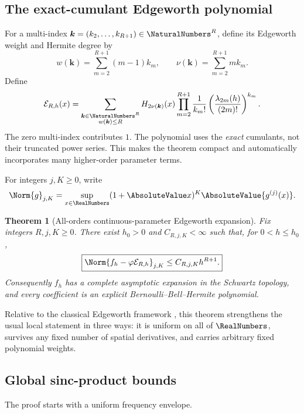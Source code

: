 \documentclass[11pt]{article}
\numberwithin{equation}{section}
\newtheorem{theorem}{Theorem}[section]
\theoremstyle{definition}
\newcommand{\phiN}{\varphi}
\begin{document}
\subsection{The exact-cumulant Edgeworth polynomial}
For a multi-index \(\bm k=(k_2,\ldots,k_{R+1})\in\NaturalNumbers^R\), define its Edgeworth weight and Hermite degree by
\begin{equation}\label{eq:weights}
 w(\bm k)=\sum_{m=2}^{R+1}(m-1)k_m,
 \qquad
 \nu(\bm k)=\sum_{m=2}^{R+1}mk_m.
\end{equation}
Define
\begin{equation}\label{eq:edgeworth-polynomial}
 \mathcal E_{R,h}(x)=
 \sum_{\substack{\bm k\in\NaturalNumbers^R\\w(\bm k)\le R}}
 H_{2\nu(\bm k)}(x)
 \prod_{m=2}^{R+1}\frac1{k_m!}
 \left(\frac{\lambda_{2m}(h)}{(2m)!}\right)^{k_m}.
\end{equation}
The zero multi-index contributes \(1\).  The polynomial uses the \emph{exact} cumulants, not their truncated power series.  This makes the theorem compact and automatically incorporates many higher-order parameter terms.

For integers \(j,K\ge0\), write
\begin{equation}\label{eq:schwartz-seminorm}
 \Norm{g}_{j,K}=\sup_{x\in\RealNumbers}(1+\AbsoluteValue x)^K\AbsoluteValue{g^{(j)}(x)}.
\end{equation}

\begin{theorem}[All-orders continuous-parameter Edgeworth expansion]\label{thm:edgeworth-schwartz}
Fix integers \(R,j,K\ge0\).  There exist \(h_0>0\) and \(C_{R,j,K}<\infty\) such that, for \(0<h\le h_0\),
\begin{equation}\label{eq:edgeworth-main}
 \boxed{
 \Norm{f_h-\phiN\mathcal E_{R,h}}_{j,K}
 \le C_{R,j,K}h^{R+1}.}
\end{equation}
Consequently \(f_h\) has a complete asymptotic expansion in the Schwartz topology, and every coefficient is an explicit Bernoulli--Bell--Hermite polynomial.
\end{theorem}

Relative to the classical Edgeworth framework \cite{BhattacharyaRao,Petrov}, this theorem strengthens the usual local statement in three ways: it is uniform on all of \(\RealNumbers\), survives any fixed number of spatial derivatives, and carries arbitrary fixed polynomial weights.

\subsection{Global sinc-product bounds}
The proof starts with a uniform frequency envelope.
\end{document}
